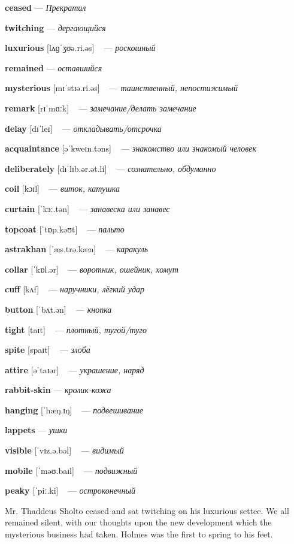 \documentclass[a4paper,oneside,12pt]{amsart}
\begin{document}
{\large 

 {\bf ceased } --- \emph{ Прекратил }

{\bf twitching } --- \emph{ дергающийся }

{\bf luxurious } [lʌɡˈʒʊə.ri.əs] ~ --- \emph{ роскошный }

{\bf remained } --- \emph{ оставшийся }

{\bf mysterious } [mɪˈstɪə.ri.əs] ~ --- \emph{ таинственный, непостижимый }

{\bf remark } [rɪˈmɑːk] ~ --- \emph{ замечание/делать замечание }

{\bf delay } [dɪˈleɪ] ~ --- \emph{ откладывать/отсрочка }

{\bf acquaintance } [əˈkweɪn.təns] ~ --- \emph{ знакомство или знакомый человек }

{\bf deliberately } [dɪˈlɪb.ər.ət.li] ~ --- \emph{ сознательно, обдуманно }

{\bf coil } [kɔɪl] ~ --- \emph{ виток, катушка }

{\bf curtain } [ˈkɜː.tən] ~ --- \emph{ занавеска или занавес }

{\bf topcoat } [ˈtɒp.kəʊt] ~ --- \emph{ пальто }

{\bf astrakhan } [ˈæs.trə.kæn] ~ --- \emph{ каракуль }

{\bf collar } [ˈkɒl.ər] ~ --- \emph{ воротник, ошейник, хомут }

{\bf cuff } [kʌf] ~ --- \emph{ наручники, лёгкий удар }

{\bf button } [ˈbʌt.ən] ~ --- \emph{ кнопка }

{\bf tight } [taɪt] ~ --- \emph{ плотный, тугой/туго }

{\bf spite } [spaɪt] ~ --- \emph{ злоба }

{\bf attire } [əˈtaɪər] ~ --- \emph{ украшение, наряд }

{\bf rabbit-skin } --- \emph{ кролик-кожа }

{\bf hanging } [ˈhæŋ.ɪŋ] ~ --- \emph{ подвешивание }

{\bf lappets } --- \emph{ ушки }

{\bf visible } [ˈvɪz.ə.bəl] ~ --- \emph{ видимый }

{\bf mobile } [ˈməʊ.baɪl] ~ --- \emph{ подвижный }

{\bf peaky } [ˈpiː.ki] ~ --- \emph{ остроконечный }

} \vspace{6mm} {\Large 

 
Mr. Thaddeus Sholto ceased and sat twitching on his luxurious settee. We all remained silent, with our thoughts upon the new development which the mysterious business had taken. Holmes was the first to spring to his feet.

}
\end{document}
